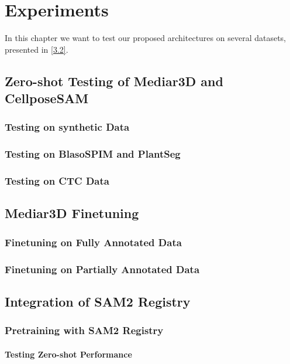 \chapter{Experiments}

In this chapter we want to test our proposed architectures on several datasets, presented in \ref{3.2}. %


\section{Zero-shot Testing of Mediar3D and CellposeSAM}

\subsection{Testing on synthetic Data}

\subsection{Testing on BlasoSPIM and PlantSeg}

\subsection{Testing on CTC Data}

\section{Mediar3D Finetuning}

\subsection{Finetuning on Fully Annotated Data}

\subsection{Finetuning on Partially Annotated Data}

\section{Integration of SAM2 Registry}

\subsection{Pretraining with SAM2 Registry}

\subsubsection{Testing Zero-shot Performance}

